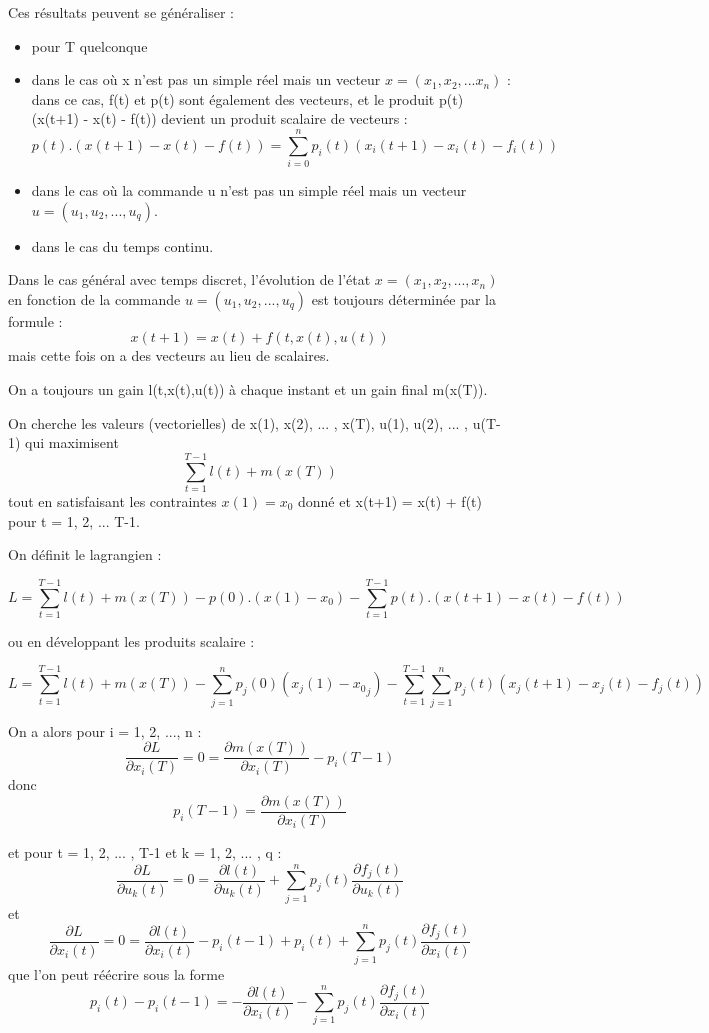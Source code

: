 \documentclass[10pt]{article}
\begin{document}
Ces résultats peuvent se généraliser :
\begin{itemize}
     \setlength{\itemsep}{1pt}
     \setlength{\parskip}{0pt}
     \setlength{\parsep}{0pt}
\item pour T quelconque
\item dans le cas où x n'est pas un simple réel mais un vecteur \( x = (x_1, x_2, ... x_n) \) : dans ce cas, f(t) et p(t) sont également des vecteurs, et le produit p(t) (x(t+1) - x(t) - f(t)) devient un produit scalaire de vecteurs :
\[ p(t) . (x(t+1) - x(t) - f(t)) = \sum_{i=0}^n{p_i(t) (x_i(t+1) - x_i(t) - f_i(t))} \]
\item dans le cas où la commande u n'est pas un simple réel mais un vecteur \( u = (u_1, u_2, ... , u_q) \).
\item dans le cas du temps continu.
\end{itemize}

Dans le cas général avec temps discret, l'évolution de l'état \( x = (x_1, x_2, ... , x_n) \) en fonction de la commande \( u = (u_1, u_2, ... , u_q) \) est toujours déterminée par la formule : 
\[ x(t+1) = x(t) + f(t,x(t),u(t)) \]
mais cette fois on a des vecteurs au lieu de scalaires.

On a toujours un gain l(t,x(t),u(t)) à chaque instant et un gain final m(x(T)).

On cherche les valeurs (vectorielles) de x(1), x(2), ... , x(T), u(1), u(2), ... , u(T-1) qui maximisent 
\[ \sum_{t=1}^{T-1}l(t) + m(x(T)) \]
tout en satisfaisant les contraintes \( x(1) = x_0 \) donné et x(t+1) = x(t) + f(t) pour t = 1, 2, ... T-1.

On définit le lagrangien :

\[ L = \sum_{t=1}^{T-1}l(t) + m(x(T)) - p(0) . (x(1) - x_0) - \sum_{t=1}^{T-1} p(t) . (x(t+1) - x(t) - f(t)) \]

ou en développant les produits scalaire :

\[ L = \sum_{t=1}^{T-1}l(t) + m(x(T)) - \sum_{j=1}^n p_j(0) (x_j(1) - {x_0}_j) - \sum_{t=1}^{T-1} \sum_{j=1}^n p_j(t) (x_j(t+1) - x_j(t) - f_j(t)) \]

On a alors pour i = 1, 2, ..., n :
\[ \frac{\partial L}{\partial x_i(T)} = 0 = \frac{\partial m(x(T))}{\partial x_i(T)} - p_i(T-1) \]
donc
\[ p_i(T-1) = \frac{\partial m(x(T))}{\partial x_i(T)} \]

et pour t = 1, 2, ... , T-1 et k = 1, 2, ... , q :
 \[ \frac{\partial L}{\partial u_k(t)} = 0 = \frac{\partial l(t)}{\partial u_k(t)} + \sum_{j=1}^n p_j(t) \frac{\partial f_j(t)}{\partial u_k(t)} \]
et
 \[ \frac{\partial L}{\partial x_i(t)} = 0 = \frac{\partial l(t)}{\partial x_i(t)} - p_i(t-1) + p_i(t) + \sum_{j=1}^n p_j(t) \frac{\partial f_j(t)}{\partial x_i(t)} \]
que l'on peut réécrire sous la forme
\[ p_i(t) - p_i(t-1) = - \frac{\partial l(t)}{\partial x_i(t)} - \sum_{j=1}^n p_j(t) \frac{\partial f_j(t)}{\partial x_i(t)} \]
\end{document}
